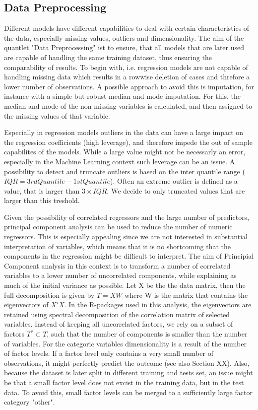 \subsection{Data Preprocessing}

Different models have different capabilities to deal with certain characteristics of the data, especially missing values, outliers and dimensionality.  The aim of the quantlet "Data Preprocessing" ist to ensure, that all models that are later used are capable of handling the same training dataset, thus ensuring the comparability of results. 
To begin with, i.e. regression models are not capable of handling missing data which results in a rowwise deletion of cases and threfore a lower number of observations. A possible approach to avoid this is  imputation, for instance with a simple but robust median and mode imputation. For this, the median and mode of the non-missing variables is calculated, and then assigned to the missing values of that variable. 

Especially in regression models outliers in the data can have a large impact on the regression coefficients (high leverage), and therefore impede the out of sample capabilites of the  models. While a large value might not be necessarly an error, especially in the Machine Learning context such leverage can be an issue. A possibility to detect and truncate outliers is based on the inter quantile range ($IQR = 3rd Quantile -1st Quantile$).
Often an extreme outlier is defined as a value, that is larger than $3 \times IQR$. We decide to only truncated values that are larger than this treshold. 

Given the possibility of correlated regressors and the large number of predictors, principal component analysis can be used to reduce the number of numeric regressors. This is especially appealing since we are not interested in substantial interpretation of variables, which means that it is no shortcoming that the components in the regression might be difficult to interpret. 
The aim of Principial Component analysis in this context is to transform a number of correlated variables to a lower number of uncorrelated components, while explaining as much of the initial variance as possible. 
Let X be the the data matrix, then the full decomposition is given by 
  $  T = XW $
where W is the matrix that contains the eigenvectors of $X'X$.  
In the R-packages used in this analysis, the eigenvectors are retained using spectral decomposition of the correlation matrix of selected variables.
Instead of keeping all uncorrelated factors, we rely on a subset of factors $T^* \subset T$, such that the number of components is smaller than the number of variables. 
For the categoric variables dimensionality is a result of the number of factor levels. If a factor level only contains a very small number of observations, it might perfectly predict the outcome (see also Section XX). Also, because the dataset is later split in different training and tests set, an issue might be that a small factor level does not excist in the training data, but in the test data. To avoid this, small factor levels can be merged to a sufficiently large factor category "other". 